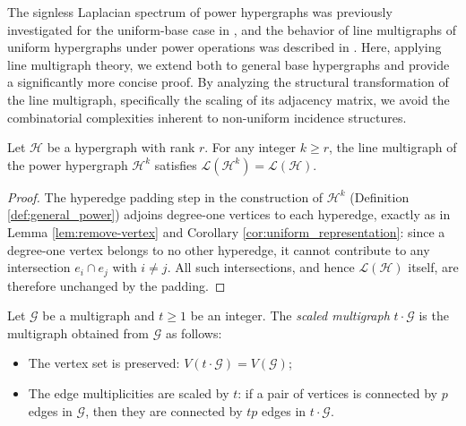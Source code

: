 \documentclass[12pt,reqno]{amsart}
\begin{document}
The signless Laplacian spectrum of power hypergraphs was previously investigated for the uniform-base case in \cite{kaue-lap}, and the behavior of line multigraphs of uniform hypergraphs under power operations was described in \cite{kaue-energia}. Here, applying line multigraph theory, we extend both to general base hypergraphs and provide a significantly more concise proof. By analyzing the structural transformation of the line multigraph, specifically the scaling of its adjacency matrix, we avoid the combinatorial complexities inherent to non-uniform incidence structures.

\begin{corollary}\label{cor:power_inv}
Let $\mathcal{H}$ be a hypergraph with rank $r$. For any integer $k \geq r$, the line multigraph of the power hypergraph $\mathcal{H}^k$ satisfies $\mathcal{L}(\mathcal{H}^k) = \mathcal{L}(\mathcal{H})$.
\end{corollary}
\begin{proof}
The hyperedge padding step in the construction of $\mathcal{H}^k$ (Definition \ref{def:general_power}) adjoins degree-one vertices to each hyperedge, exactly as in Lemma \ref{lem:remove-vertex} and Corollary \ref{cor:uniform_representation}: since a degree-one vertex belongs to no other hyperedge, it cannot contribute to any intersection $e_i \cap e_j$ with $i \neq j$. All such intersections, and hence $\mathcal{L}(\mathcal{H})$ itself, are therefore unchanged by the padding.
\end{proof}

\begin{definition}\label{def:scaled_multigraph}
Let $\mathcal{G}$ be a multigraph and $t \geq 1$ be an integer. The \textit{scaled multigraph} $t \cdot \mathcal{G}$ is the multigraph obtained from $\mathcal{G}$ as follows:
\begin{itemize}
\item The vertex set is preserved: $V(t \cdot \mathcal{G}) = V(\mathcal{G})$;
\item The edge multiplicities are scaled by $t$: if a pair of vertices is connected by $p$ edges in $\mathcal{G}$, then they are connected by $tp$ edges in $t \cdot \mathcal{G}$.
\end{itemize}
\end{definition}
\end{document}
